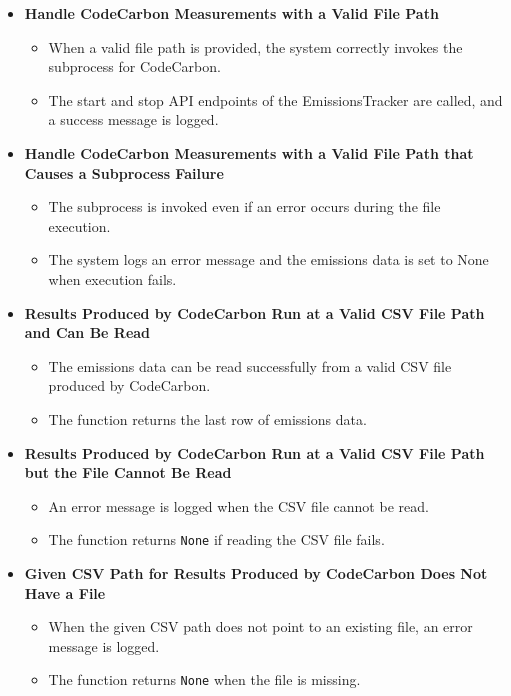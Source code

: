 \documentclass[12pt, titlepage]{article}
\begin{document}
  \begin{itemize}
    \item \textbf{Handle CodeCarbon Measurements with a Valid File Path}
      \begin{itemize}
        \item When a valid file path is provided, the system
          correctly invokes the subprocess for CodeCarbon.
        \item The start and stop API endpoints of the
          EmissionsTracker are called, and a success message is logged.
      \end{itemize}

    \item \textbf{Handle CodeCarbon Measurements with a Valid File
      Path that Causes a Subprocess Failure}
      \begin{itemize}
        \item The subprocess is invoked even if an error occurs
          during the file execution.
        \item The system logs an error message and the emissions data
          is set to None when execution fails.
      \end{itemize}

    \item \textbf{Results Produced by CodeCarbon Run at a Valid CSV
      File Path and Can Be Read}
      \begin{itemize}
        \item The emissions data can be read successfully from a
          valid CSV file produced by CodeCarbon.
        \item The function returns the last row of emissions data.
      \end{itemize}

    \item \textbf{Results Produced by CodeCarbon Run at a Valid CSV
      File Path but the File Cannot Be Read}
      \begin{itemize}
        \item An error message is logged when the CSV file cannot be read.
        \item The function returns \texttt{None} if reading the CSV file fails.
      \end{itemize}

    \item \textbf{Given CSV Path for Results Produced by CodeCarbon
      Does Not Have a File}
      \begin{itemize}
        \item When the given CSV path does not point to an existing
          file, an error message is logged.
        \item The function returns \texttt{None} when the file is missing.
      \end{itemize}
  \end{itemize}
\end{document}
